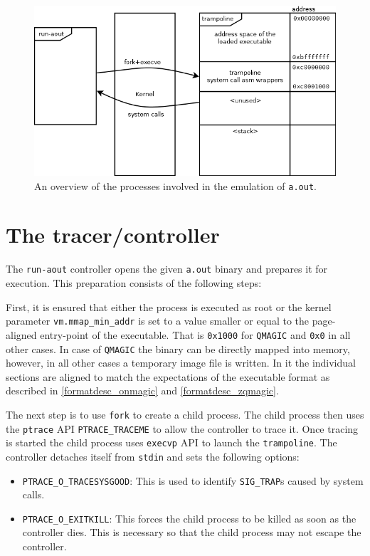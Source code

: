 \documentclass[draft,final]{vutinfth} %
\begin{document}
\begin{figure}[H]
    \centering
    \includegraphics[scale=0.5]{run-aout.png}
    \caption{An overview of the processes involved in the emulation of \texttt{a.out}.}
    \label{fig:architecture_overview}
\end{figure}

\section{The tracer/controller}
\label{solution_tracer}

The \texttt{run-aout} controller opens the given \texttt{a.out} binary and prepares it for execution. This preparation consists of the following steps:

First, it is ensured that either the process is executed as root or the kernel parameter \texttt{vm.mmap\_min\_addr} is set to a value smaller or equal to the page-aligned entry-point of the executable. That is \texttt{0x1000} for \texttt{QMAGIC} and \texttt{0x0} in all other cases. In case of \texttt{QMAGIC} the binary can be directly mapped into memory, however, in all other cases a temporary image file is written. In it the individual sections are aligned to match the expectations of the executable format as described in \ref{formatdesc_onmagic} and \ref{formatdesc_zqmagic}.

The next step is to use \texttt{fork} to create a child process. The child process then uses the \texttt{ptrace} API \texttt{PTRACE\_TRACEME} to allow the controller to trace it. Once tracing is started the child process uses \texttt{execvp} API to launch the \texttt{trampoline}. The controller detaches itself from \texttt{stdin} and sets the following options:

\begin{itemize}
    \item \texttt{PTRACE\_O\_TRACESYSGOOD}: This is used to identify \texttt{SIG\_TRAP}s caused by system calls.
    \item \texttt{PTRACE\_O\_EXITKILL}: This forces the child process to be killed as soon as the controller dies. This is necessary so that the child process may not escape the controller.
\end{itemize}
\end{document}
